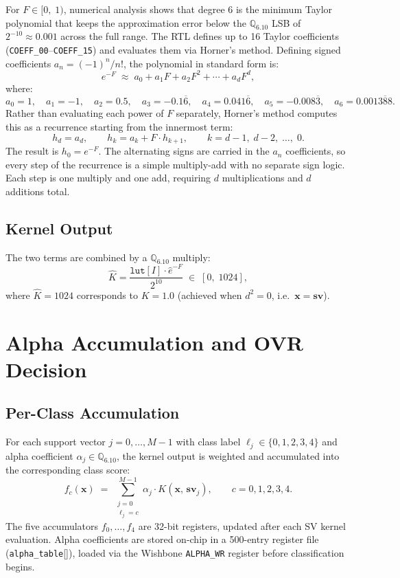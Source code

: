 \documentclass[11pt]{article}
\begin{document}
For \(F \in [0,\; 1)\), numerical analysis shows that degree 6 is the minimum
Taylor polynomial that keeps the approximation error below the
\(\mathbb{Q}_{6.10}\) LSB of \(2^{-10} \approx 0.001\) across the full range.
The RTL defines up to 16 Taylor coefficients (\texttt{COEFF\_00}--\texttt{COEFF\_15})
and evaluates them via Horner's method. Defining signed coefficients
\(a_n = (-1)^n / n!\), the polynomial in standard form is:
\[
    e^{-F} \;\approx\; a_0 + a_1 F + a_2 F^2 + \cdots + a_d F^d,
\]
where:
\[
    a_0 = 1,\quad
    a_1 = -1,\quad
    a_2 = 0.5,\quad
    a_3 = -0.1\overline{6},\quad
    a_4 = 0.041\overline{6},\quad
    a_5 = -0.008\overline{3},\quad
    a_6 = 0.001\overline{388}.
\]
Rather than evaluating each power of \(F\) separately,
Horner's method computes this as a recurrence starting from the innermost term:
\[
    h_d = a_d, \qquad h_k = a_k + F \cdot h_{k+1}, \qquad k = d-1,\; d-2,\; \ldots,\; 0.
\]
The result is \(h_0 = e^{-F}\). The alternating signs are carried in the
\(a_n\) coefficients, so every step of the recurrence is a simple multiply-add
with no separate sign logic. Each step is one multiply and one add,
requiring \(d\) multiplications and \(d\) additions total.

\subsection{Kernel Output}

The two terms are combined by a \(\mathbb{Q}_{6.10}\) multiply:
\[
    \hat{K} = \frac{\texttt{lut}[I] \cdot \hat{e}^{-F}}{2^{10}}
    \;\in\; [0,\; 1024],
\]
where \(\hat{K} = 1024\) corresponds to \(K = 1.0\) (achieved when
\(d^2 = 0\), i.e.\ \(\mathbf{x} = \mathbf{sv}\)).

\section{Alpha Accumulation and OVR Decision}

\subsection{Per-Class Accumulation}

For each support vector \(j = 0, \ldots, M-1\) with class label
\(\ell_j \in \{0,1,2,3,4\}\) and alpha coefficient
\(\alpha_j \in \mathbb{Q}_{6.10}\), the kernel output is weighted and
accumulated into the corresponding class score:
\[
    f_c(\mathbf{x}) \;=\;
    \sum_{\substack{j=0 \\ \ell_j = c}}^{M-1}
    \alpha_j \cdot K(\mathbf{x},\, \mathbf{sv}_j),
    \qquad c = 0, 1, 2, 3, 4.
\]
The five accumulators \(f_0, \ldots, f_4\) are 32-bit registers, updated
after each SV kernel evaluation. Alpha coefficients are stored on-chip in
a 500-entry register file (\texttt{alpha\_table}[]), loaded via the
Wishbone \texttt{ALPHA\_WR} register before classification begins.
\end{document}
